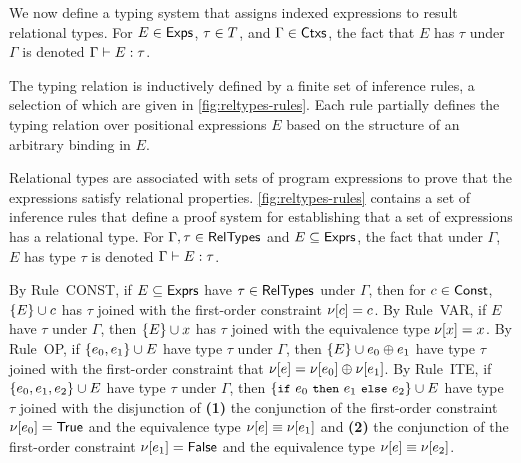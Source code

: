     
We now define a typing system that assigns indexed expressions to
result relational types.
%
For $E \in \mathsf{Exps}$, $\tau \in T$, and $\Gamma \in \mathsf{Ctxs}$,
the fact that $E$ has $\tau$ under $\Gamma$ is denoted
$\Gamma \vdash E : \tau$.

The typing relation is inductively defined by a finite set of
inference rules, a selection of which are given in
\autoref{fig:reltypes-rules}.
%
Each rule partially defines the typing relation over positional
expressions $E$ based on the structure of an arbitrary binding in $E$.

Relational types are associated with sets of program expressions to
prove that the expressions satisfy relational properties.
%
\autoref{fig:reltypes-rules} contains a set of inference rules that
define a proof system for establishing that a set of expressions has a
relational type.
%
For $\Gamma, \tau \in \mathsf{RelTypes}$ and $E \subseteq \mathsf{Exprs}$, the fact
that under $\Gamma$, $E$ has type $\tau$ is denoted $\Gamma \vdash E
: \tau$.

%
By Rule~CONST, if $E \subseteq \mathsf{Exprs}$ have $\tau \in \mathsf{RelTypes}$ under
$\Gamma$, then for $c \in \mathsf{Const}$, $\{ E \} \cup c$ has $\tau$ joined with
the first-order constraint $\nu[ c ] = c$.
By Rule~VAR, if $E$ have $\tau$ under $\Gamma$, then $\{ E \} \cup x$ has
$\tau$ joined with the equivalence type $\nu[ x ] = x$.
By Rule~OP, if $\{  e_0, e_1  \} \cup E$ have type $\tau$ under
$\Gamma$, then $\{  E  \} \cup  e_0 \oplus e_1 $ have type $\tau$ joined
with the first-order constraint that $\nu[ e ] = \nu[ e_0 ] \oplus
\nu[ e_1 ]$.
By Rule~ITE, if $\{  e_0, e_1, e_2  \} \cup E$ have type $\tau$
under $\Gamma$, then $\add { \ite{ e_0 }{ e_1 }{ e_2 } }{ E }$ have
type $\tau$ joined with the disjunction of \textbf{(1)} the
conjunction of the first-order constraint $\nu[ e_0 ] = \mathsf{True}$ and
the equivalence type $\nu[ e ] \equiv \nu[ e_1 ]$ and %
\textbf{(2)} the conjunction of the first-order constraint
$\nu[ e_1 ] = \mathsf{False}$ and the equivalence type $\nu[ e ] \equiv
\nu[ e_2 ]$.

